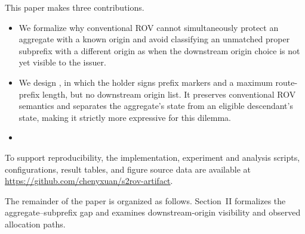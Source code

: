 This paper makes three contributions.
\begin{itemize}
\item We formalize why conventional ROV cannot simultaneously protect an aggregate with a known origin and avoid classifying an unmatched proper subprefix with a different origin as \invalid{} when the downstream origin choice is not yet visible to the issuer.
\item We design \ssrov{}, in which the holder signs prefix markers and a maximum route-prefix length, but no downstream origin list. It preserves conventional ROV semantics and separates the aggregate's \explicit{} state from an eligible descendant's \openscope{} state, making it strictly more expressive for this dilemma.
\item {}
\end{itemize}

To support reproducibility, the implementation, experiment and analysis scripts, configurations, result tables, and figure source data are available at \url{https://github.com/chenyxuan/s2rov-artifact}.

The remainder of the paper is organized as follows. Section~II formalizes the aggregate--subprefix gap and examines downstream-origin visibility and observed allocation paths. 
